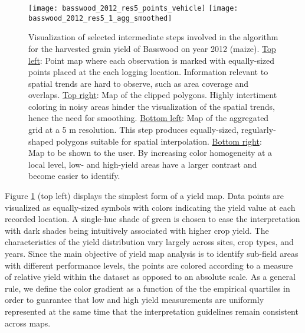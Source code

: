 \begin{figure}[H]  \centering
  \texttt{[image: basswood\_2012\_res5\_points\_vehicle]}
  \texttt{[image: basswood\_2012\_res5\_1\_agg\_smoothed]}
  \caption[Visualization of selected algorithm steps as applied to a
  specific dataset]{Visualization of selected intermediate steps
    involved in the algorithm for the harvested grain yield of
    Basswood on year 2012 (maize). \underline{Top left}: Point map
    where each observation is marked with equally-sized points placed
    at the each logging location. Information relevant to spatial
    trends are hard to observe, such as area coverage and
    overlaps. \underline{Top right}: Map of the clipped
    polygons. Highly intertiment coloring in noisy areas hinder the
    visualization of the spatial trends, hence the need for
    smoothing. \underline{Bottom left}: Map of the aggregated grid at
    a 5 m resolution. This step produces equally-sized,
    regularly-shaped polygons suitable for spatial
    interpolation. \underline{Bottom right}: Map to be shown to the
    user. By increasing color homogeneity at a local level, low- and
    high-yield areas have a larger contrast and become easier to
    identify.}
  \label{fig:basswood2012-main-steps}
\end{figure}

 Figure \ref{fig:basswood2012-main-steps}
(top left) displays the simplest form of a yield map. Data points are
visualized as equally-sized symbols with colors indicating the yield
value at each recorded location. A single-hue shade of green is chosen
to ease the interpretation with dark shades being intuitively
associated with higher crop yield. The characteristics of the yield
distribution vary largely across sites, crop types, and years. Since
the main objective of yield map analysis is to identify sub-field
areas with different performance levels, the points are colored
according to a measure of relative yield within the dataset as opposed
to an absolute scale. As a general rule, we define the color gradient
as a function of the the empirical quartiles in order to guarantee
that low and high yield measurements are uniformly represented at the
same time that the interpretation guidelines remain consistent across
maps.

